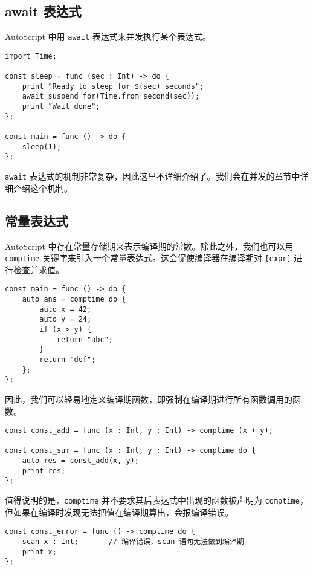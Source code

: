 \subsection{await 表达式}

AutoScript 中用 \lstinline!await! 表达式来并发执行某个表达式。

\begin{lstlisting}
import Time;

const sleep = func (sec : Int) -> do {
    print "Ready to sleep for $(sec) seconds";
    await suspend_for(Time.from_second(sec));
    print "Wait done";
};

const main = func () -> do {
    sleep(1);
};
\end{lstlisting}

\lstinline!await! 表达式的机制非常复杂，因此这里不详细介绍了。我们会在并发的章节中详细介绍这个机制。

\subsection{常量表达式}

AutoScript 中存在常量存储期来表示编译期的常数。除此之外，我们也可以用 \lstinline!comptime! 关键字来引入一个常量表达式。这会促使编译器在编译期对 \texttt{[expr]} 进行检查并求值。

\begin{lstlisting}
const main = func () -> do {
    auto ans = comptime do {
        auto x = 42;
        auto y = 24;
        if (x > y) {
            return "abc";
        }
        return "def";
    };
};
\end{lstlisting}

因此，我们可以轻易地定义编译期函数，即强制在编译期进行所有函数调用的函数。

\begin{lstlisting}
const const_add = func (x : Int, y : Int) -> comptime (x + y);

const const_sum = func (x : Int, y : Int) -> comptime do {
    auto res = const_add(x, y);
    print res;
};
\end{lstlisting}

值得说明的是，\lstinline!comptime! 并不要求其后表达式中出现的函数被声明为 \lstinline!comptime!，但如果在编译时发现无法把值在编译期算出，会报编译错误。

\begin{lstlisting}
const const_error = func () -> comptime do {
    scan x : Int;       // 编译错误，scan 语句无法做到编译期
    print x;
};
\end{lstlisting}

